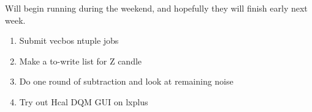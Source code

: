Will begin running during the weekend, and hopefully they will finish early next week.




\begin{enumerate}
\item Submit vecbos ntuple jobs
\item Make a to-write list for Z candle
\item Do one round of subtraction and look at remaining noise
\item Try out Hcal DQM GUI on lxplus
\end{enumerate}


